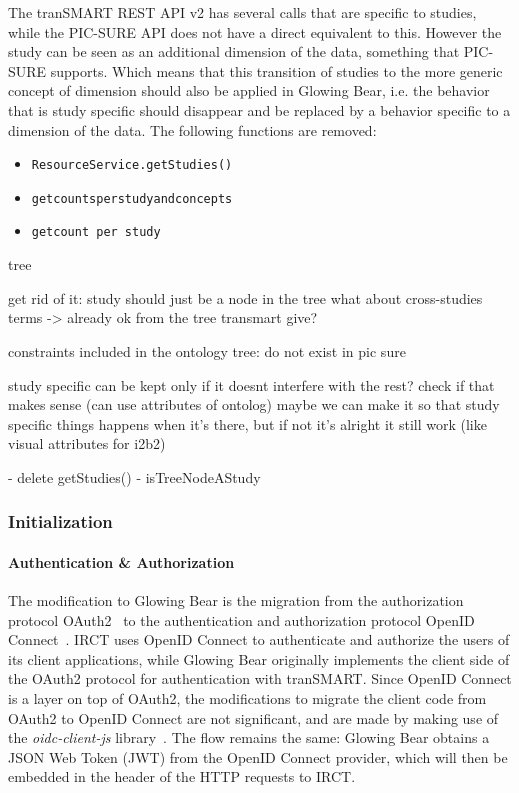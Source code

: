 The tranSMART REST API v2 has several calls that are specific to studies, while the PIC-SURE API does not have a direct equivalent to this.
However the study can be seen as an additional dimension of the data, something that PIC-SURE supports.
Which means that this transition of studies to the more generic concept of dimension should also be applied in Glowing Bear, i.e. the behavior that is study specific should disappear and be replaced by a behavior specific to a dimension of the data. 
The following functions are removed:
\begin{itemize}
    \item \verb|ResourceService.getStudies()|
    \item \verb|getcountsperstudyandconcepts|
    \item \verb|getcount per study|
\end{itemize}

tree

get rid of it: study should just be a node in the tree 
what about cross-studies terms -> already ok from the tree transmart give?

constraints included in the ontology tree: do not exist in pic sure

study specific can be kept only if it doesnt interfere with the rest? check if that makes sense (can use attributes of ontolog)
maybe we can make it so that study specific things happens when it's there, but if not it's alright it still work (like visual attributes for i2b2)



- delete getStudies()
- isTreeNodeAStudy




\subsubsection{Initialization}

\paragraph{Authentication \& Authorization}
The modification to Glowing Bear is the migration from the authorization protocol OAuth2~\cite{oauth2} to the authentication and authorization protocol OpenID Connect~\cite{openidconnect}.
IRCT uses OpenID Connect to authenticate and authorize the users of its client applications, while Glowing Bear originally implements the client side of the OAuth2 protocol for authentication with tranSMART. 
Since OpenID Connect is a layer on top of OAuth2, the modifications to migrate the client code from OAuth2 to OpenID Connect are not significant, and are made by making use of the \emph{oidc-client-js} library~\cite{oidc-client-js}.
The flow remains the same: Glowing Bear obtains a JSON Web Token (JWT) from the OpenID Connect provider, which will then be embedded in the header of the HTTP requests to IRCT.

